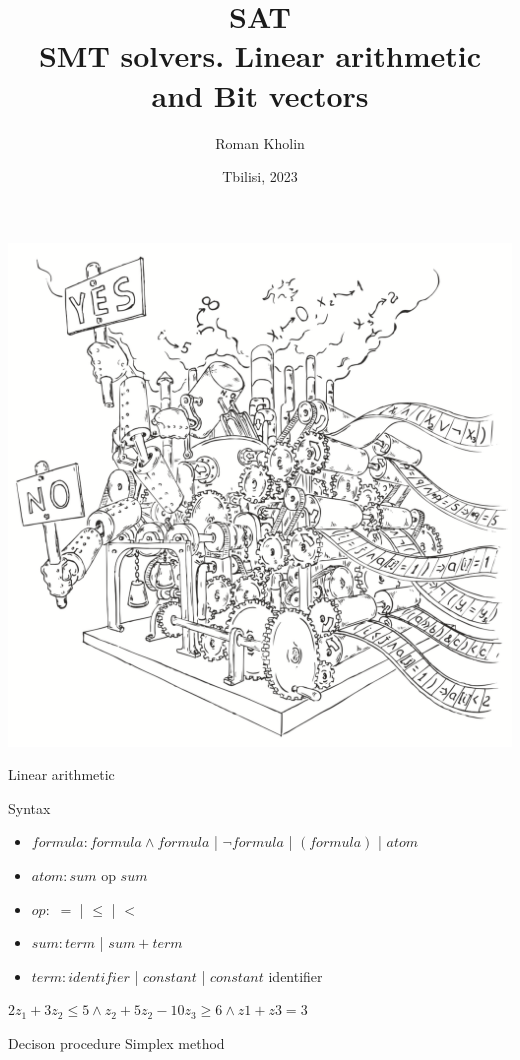 \documentclass{beamer}
\begin{document}
\title{SAT\\SMT solvers. Linear arithmetic and Bit vectors}
\author{Roman Kholin}
\date{Tbilisi, 2023}

\begin{frame}
\includegraphics[scale=0.5]{../decision-procedure.png}
\end{frame}

\frame{\titlepage}

\begin{frame}{Linear arithmetic}
\begin{block}{Syntax}
\begin{itemize}
\item $formula: formula \wedge formula$ | $\lnot formula$ | $(formula)$ | $atom$
\item $atom : sum$ op $sum$
\item $op :$ $=$ | $\le$ | $<$
\item $sum : term$ | $sum + term$
\item $term : identifier$ | $constant$ | $constant$ identifier
\end{itemize}
$2z_1 + 3z_2 \le 5 \wedge z_2 + 5z_2 - 10z_3 \ge 6 \wedge z1 + z3 = 3$
\end{block}
\begin{block}{Decison procedure}
Simplex method
\end{block}
\end{frame}
\end{document}
